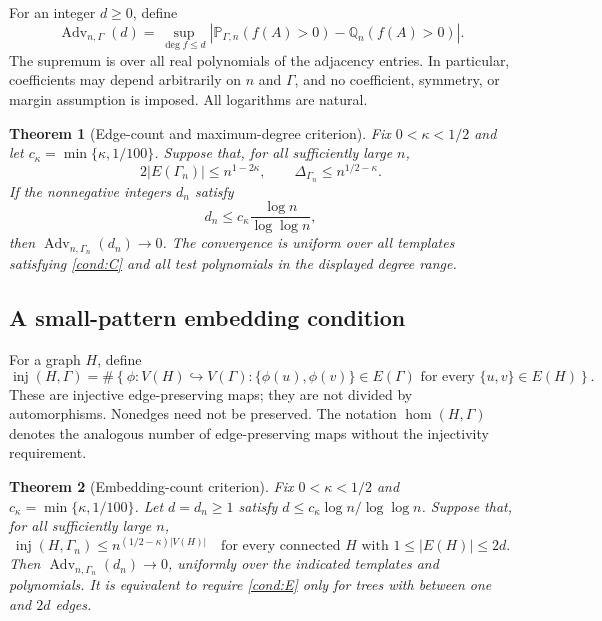 \documentclass[11pt]{article}
\newcommand{\Pp}{\mathbb P}
\newcommand{\Qq}{\mathbb Q}
\newcommand{\Adv}{\operatorname{Adv}}
\newcommand{\inj}{\operatorname{inj}}
\renewcommand{\hom}{\operatorname{hom}}
\newcommand{\1}{\mathbf 1}
\newtheorem{theorem}{Theorem}[section]
\theoremstyle{definition}
\theoremstyle{remark}
\numberwithin{equation}{section}
\begin{document}
For an integer $d\ge0$, define
\[
 \Adv_{n,\Gamma}(d)
 =\sup_{\deg f\le d}
 \left|\Pp_{\Gamma,n}(f(A)>0)-\Qq_n(f(A)>0)\right|.
\]
The supremum is over all real polynomials of the adjacency entries. In particular, coefficients may depend arbitrarily on $n$ and $\Gamma$, and no coefficient, symmetry, or margin assumption is imposed. All logarithms are natural.

\begin{theorem}[Edge-count and maximum-degree criterion]\label{thm:main}
Fix $0<\kappa<1/2$ and let $c_\kappa=\min\{\kappa,1/100\}$. Suppose that, for all sufficiently large $n$,
\begin{equation}\tag{C}\label{cond:C}
 2|E(\Gamma_n)|\le n^{1-2\kappa},
 \qquad
 \Delta_{\Gamma_n}\le n^{1/2-\kappa}.
\end{equation}
If the nonnegative integers $d_n$ satisfy
\[
 d_n\le c_\kappa\frac{\log n}{\log\log n},
\]
then $\Adv_{n,\Gamma_n}(d_n)\to0$. The convergence is uniform over all templates satisfying \eqref{cond:C} and all test polynomials in the displayed degree range.
\end{theorem}

\subsection{A small-pattern embedding condition}
For a graph $H$, define
\[
 \inj(H,\Gamma)
 =\#\left\{\phi:V(H)\hookrightarrow V(\Gamma):
       \{\phi(u),\phi(v)\}\in E(\Gamma)
       \text{ for every }\{u,v\}\in E(H)\right\}.
\]
These are injective edge-preserving maps; they are not divided by automorphisms. Nonedges need not be preserved. The notation $\hom(H,\Gamma)$ denotes the analogous number of edge-preserving maps without the injectivity requirement.

\begin{theorem}[Embedding-count criterion]\label{thm:embedding}
Fix $0<\kappa<1/2$ and $c_\kappa=\min\{\kappa,1/100\}$. Let $d=d_n\ge1$ satisfy $d\le c_\kappa\log n/\log\log n$. Suppose that, for all sufficiently large $n$,
\begin{equation}\tag{E}\label{cond:E}
 \inj(H,\Gamma_n)\le n^{(1/2-\kappa)|V(H)|}
 \quad\text{for every connected }H
 \text{ with }1\le |E(H)|\le2d.
\end{equation}
Then $\Adv_{n,\Gamma_n}(d_n)\to0$, uniformly over the indicated templates and polynomials. It is equivalent to require \eqref{cond:E} only for trees with between one and $2d$ edges.
\end{theorem}
\end{document}
